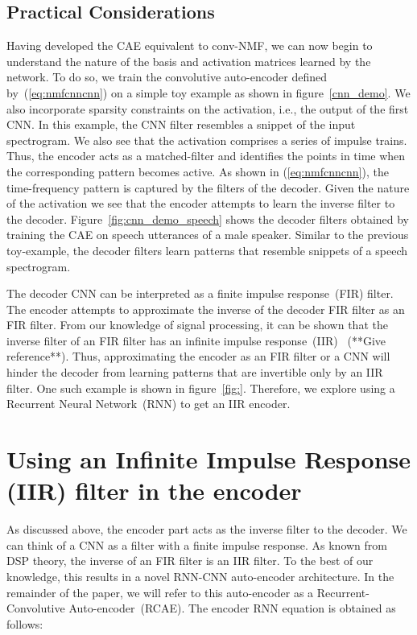 \documentclass{article}
\begin{document}
\subsection{Practical Considerations}
\label{subsec:practical}
Having developed the CAE equivalent to conv-NMF, we can now begin to understand the nature of the basis and activation matrices learned by the network. To do so, we train the convolutive auto-encoder defined by~(\ref{eq:nmfcnncnn}) on a simple toy example as shown in figure~\ref{cnn_demo}. We also incorporate sparsity constraints on the activation, i.e., the output of the first CNN. In this example, the CNN filter resembles a snippet of the input spectrogram. We also see that the activation comprises a series of impulse trains. Thus, the encoder acts as a matched-filter and identifies the points in time when the corresponding pattern becomes active. As shown in (\ref{eq:nmfcnncnn}), the time-frequency pattern is captured by the filters of the decoder. Given the nature of the activation we see that the encoder attempts to learn the inverse filter to the decoder. Figure~\ref{fig:cnn_demo_speech} shows the decoder filters obtained by training the CAE on speech utterances of a male speaker. Similar to the previous toy-example, the decoder filters learn patterns that resemble snippets of a speech spectrogram. 

The decoder CNN can be interpreted as a finite impulse response~(FIR) filter. The encoder attempts to approximate the inverse of the decoder FIR filter as an FIR filter. From our knowledge of signal processing, it can be shown that the inverse filter of an FIR filter has an infinite impulse response~(IIR)~\cite{} (**Give reference**). Thus, approximating the encoder as an FIR filter or a CNN will hinder the decoder from learning patterns that are invertible only by an IIR filter. One such example is shown in figure~\ref{fig:}. Therefore, we explore using a Recurrent Neural Network~(RNN) to get an IIR encoder.

\section{Using an Infinite Impulse Response (IIR) filter in the encoder}
\label{sec:rnncnn}

As discussed above, the encoder part acts as the inverse filter to the decoder. We can think of a CNN as a filter with a finite impulse response. As known from DSP theory, the inverse of an FIR filter is an IIR filter. To the best of our knowledge, this results in a novel RNN-CNN auto-encoder architecture. In the remainder of the paper, we will refer to this auto-encoder as a Recurrent-Convolutive Auto-encoder~(RCAE). The encoder RNN equation is obtained as follows: 
\end{document}
